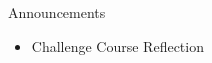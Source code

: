 \begin{frame}{Announcements}
    \begin{itemize}
        \item Challenge Course Reflection
    \end{itemize}
\end{frame}
